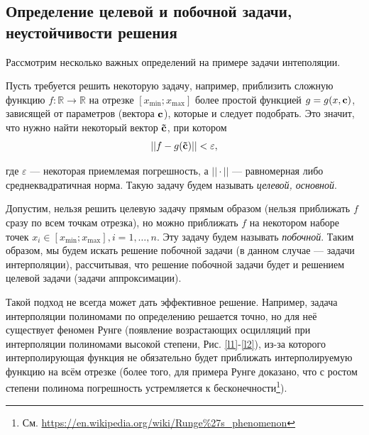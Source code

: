 \documentclass[a4paper]{article}
\begin{document}
\FloatBarrier
\subsection{Определение целевой и побочной задачи, неустойчивости решения}
Рассмотрим несколько важных определений на примере задачи интеполяции.

Пусть требуется решить некоторую задачу, например, приблизить сложную функцию $f: \mathbb{R} \rightarrow \mathbb{R}$
на отрезке $[x_{\min};x_{\max}]$ более простой функцией $g=g(x,{\bf c})$, зависящей от параметров (вектора ${\bf c}$), которые и следует подобрать.
Это значит, что нужно найти некоторый вектор ${\bf \tilde{c} }$, при котором
\begin{equation*}
  ||f-g({\bf \tilde{c}})|| < \varepsilon,
\end{equation*}

где $\varepsilon$ --- некоторая приемлемая погрешность, а $||\cdot||$ --- равномерная либо среднеквадратичная норма.
Такую задачу будем называть {\it целевой, основной}.

Допустим, нельзя решить целевую задачу прямым образом (нельзя приближать $f$ сразу по всем точкам отрезка), но можно приближать $f$ на некотором наборе точек $x_i \in [x_{\min};x_{\max}], i=1,\dots,n$.
Эту задачу будем называть {\it побочной}. Таким образом,
мы будем искать решение побочной задачи (в данном случае --- задачи интерполяции),
рассчитывая, что решение побочной задачи будет и решением целевой задачи (задачи аппроксимации).

Такой подход не всегда может дать эффективное решение. Например, задача интерполяции полиномами по определению решается точно,
но для неё существует феномен Рунге (появление возрастающих осцилляций при интерполяции полиномами высокой степени, Рис. \ref{l1}-\ref{l2}),
из-за которого интерполирующая функция не обязательно будет приближать интерполируемую функцию на всём отрезке
(более того, для примера Рунге доказано, что с ростом степени полинома погрешность устремляется к бесконечности\footnote{См. \url{https://en.wikipedia.org/wiki/Runge\%27s_phenomenon} }).
\end{document}
